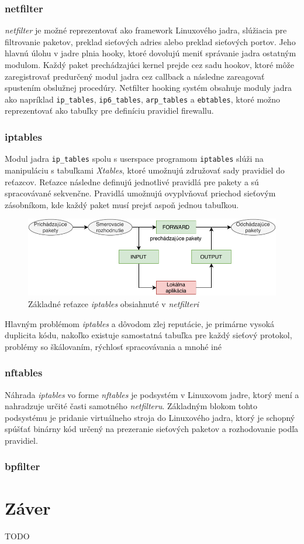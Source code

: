 \subsection{netfilter}
\emph{netfilter} je možné reprezentovať ako framework Linuxového jadra, slúžiacia pre filtrovanie paketov, preklad sieťových adries alebo preklad sieťových portov. Jeho hlavnú úlohu v jadre plnia hooky, ktoré dovolujú meniť správanie jadra ostatným modulom. Každý paket prechádzajúci kernel prejde cez sadu hookov, ktoré môže zaregistrovať predurčený modul jadra cez callback a následne zareagovať spustením obslužnej procedúry. Netfilter hooking systém obsahuje moduly jadra ako napríklad \texttt{ip\_tables}, \texttt{ip6\_tables}, \texttt{arp\_tables} a \texttt{ebtables}, ktoré možno reprezentovať ako tabuľky pre definíciu pravidiel firewallu. 

\subsection{iptables}
Modul jadra \texttt{ip\_tables} spolu s userspace programom \texttt{iptables} slúži na manipuláciu s tabuľkami \emph{Xtables}, ktoré umožnujú združovať sady pravidiel do reťazcov. Reťazce následne definujú jednotlivé pravidlá pre pakety a sú spracovávané sekvenčne. Pravidlá umožnujú ovyplvňovať priechod sieťovým zásobníkom, kde každý paket musí prejsť aspoň jednou tabuľkou.
\cite{iptables_le}
\begin{figure}[h]
	\centering
	\label{iptables}
	\includegraphics[scale=1.07]{obrazky-figures/iptables.pdf}
	\caption{Základné reťazce \emph{iptables} obsiahnuté v \emph{netfilteri}}
\end{figure}

Hlavným problémom \emph{iptables} a dôvodom zlej reputácie, je primárne vysoká duplicita kódu, nakoľko existuje samostatná tabuľka pre každý sieťový protokol, problémy so škálovaním, rýchlosť spracovávania a mnohé iné

\subsection{nftables}
Náhrada \emph{iptables} vo forme \emph{nftables} je podsystém v Linuxovom jadre, ktorý mení a nahradzuje určité časti samotného \emph{netfilteru}. Základným blokom tohto podsystému je pridanie virtuálneho stroja do Linuxového jadra, ktorý je schopný spúšťať binárny kód určený na prezeranie sieťových paketov a rozhodovanie podľa pravidiel.


\subsection{bpfilter}



\chapter{Záver}
TODO
